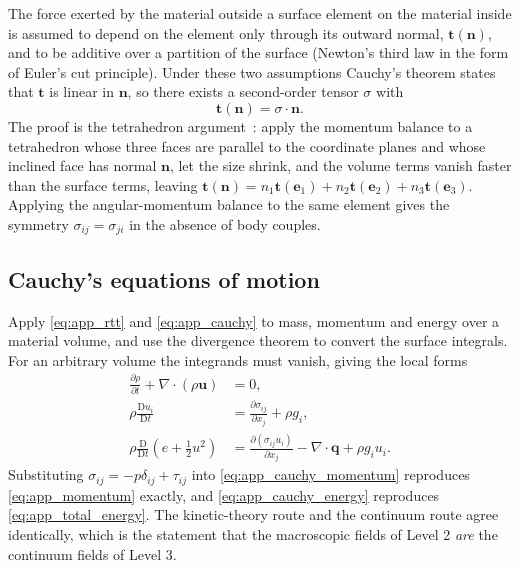 The force exerted by the material outside a surface element on the material inside is assumed to depend on the element only through its outward normal, $\mathbf{t}(\mathbf{n})$, and to be additive over a partition of the surface (Newton's third law in the form of Euler's cut principle). Under these two assumptions Cauchy's theorem states that $\mathbf{t}$ is linear in $\mathbf{n}$, so there exists a second-order tensor $\sigma$ with
\begin{equation}
    \mathbf{t}(\mathbf{n}) = \sigma\cdot\mathbf{n} .
    \label{eq:app_cauchy}
\end{equation}
The proof is the tetrahedron argument~\cite{white2006viscous}: apply the momentum balance to a tetrahedron whose three faces are parallel to the coordinate planes and whose inclined face has normal $\mathbf{n}$, let the size shrink, and the volume terms vanish faster than the surface terms, leaving $\mathbf{t}(\mathbf{n}) = n_1\mathbf{t}(\mathbf{e}_1) + n_2\mathbf{t}(\mathbf{e}_2) + n_3\mathbf{t}(\mathbf{e}_3)$. Applying the angular-momentum balance to the same element gives the symmetry $\sigma_{ij} = \sigma_{ji}$ in the absence of body couples.

\subsection{Cauchy's equations of motion}

Apply \eqref{eq:app_rtt} and \eqref{eq:app_cauchy} to mass, momentum and energy over a material volume, and use the divergence theorem to convert the surface integrals. For an arbitrary volume the integrands must vanish, giving the local forms
\begin{align}
    \frac{\partial\rho}{\partial t} + \nabla\cdot(\rho\mathbf{u}) &= 0 , \label{eq:app_cauchy_mass}\\
    \rho\frac{\mathrm{D}u_i}{\mathrm{D}t} &= \frac{\partial\sigma_{ij}}{\partial x_j} + \rho g_i , \label{eq:app_cauchy_momentum}\\
    \rho\frac{\mathrm{D}}{\mathrm{D}t}\left(e + \tfrac12 u^2\right) &= \frac{\partial(\sigma_{ij}u_i)}{\partial x_j} - \nabla\cdot\mathbf{q} + \rho g_iu_i . \label{eq:app_cauchy_energy}
\end{align}
Substituting $\sigma_{ij} = -p\delta_{ij} + \tau_{ij}$ into \eqref{eq:app_cauchy_momentum} reproduces \eqref{eq:app_momentum} exactly, and \eqref{eq:app_cauchy_energy} reproduces \eqref{eq:app_total_energy}. The kinetic-theory route and the continuum route agree identically, which is the statement that the macroscopic fields of Level 2 \emph{are} the continuum fields of Level 3.

